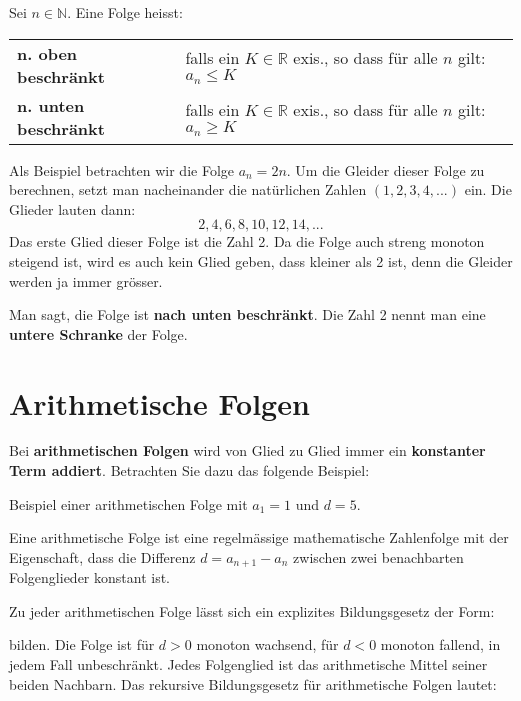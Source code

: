 \begin{definition} %
Sei $n \in \mathbb{N}$. Eine Folge heisst:

\begin{tabular}{ll}
\textbf{n. oben beschränkt} & falls ein $K \in \mathbb{R}$ exis., so dass für alle $n$ gilt: $a_{n} \leq K$ \\
\textbf{n. unten beschränkt} & falls ein $K \in \mathbb{R}$ exis., so dass für alle $n$ gilt: $a_{n} \geq K$ \\ %
\end{tabular}
\end{definition}

\begin{example}
Als Beispiel betrachten wir die Folge $a_{n} = 2n$. Um die Gleider dieser Folge zu berechnen, setzt man nacheinander die natürlichen Zahlen $(1,2,3,4,...)$ ein. Die Glieder lauten dann:
\[ 2,4,6,8,10,12,14,... \]
Das erste Glied dieser Folge ist  die Zahl 2. Da die Folge auch streng monoton steigend ist, wird es auch kein Glied geben, dass kleiner als 2 ist, denn die Gleider werden ja immer grösser.

Man sagt, die Folge ist \textbf{nach unten beschränkt}. Die Zahl 2 nennt man eine \textbf{untere Schranke} der Folge.
\end{example}

\section{Arithmetische Folgen}
Bei \textbf{arithmetischen Folgen} wird von Glied zu Glied immer ein \textbf{konstanter Term addiert}. Betrachten Sie dazu das folgende Beispiel:
\begin{example}
Beispiel einer arithmetischen Folge mit $a_{1} = 1$ und $d=5$. 
\begin{gelb}
\vspace{1.5cm}
\end{gelb}
\end{example}

\begin{definition}
Eine arithmetische Folge ist eine regelmässige mathematische Zahlenfolge mit der Eigenschaft, dass die Differenz $d = a_{n+1} - a_{n}$ zwischen zwei benachbarten Folgenglieder konstant ist.
\end{definition}

Zu jeder arithmetischen Folge lässt sich ein explizites Bildungsgesetz der Form:
\begin{gelb}
\vspace{2cm}
\end{gelb}
bilden. Die Folge ist für $d>0$ monoton wachsend, für $d<0$ monoton fallend, in jedem Fall unbeschränkt. Jedes Folgenglied ist das arithmetische Mittel seiner beiden Nachbarn. Das rekursive Bildungsgesetz für arithmetische Folgen lautet:
\begin{gelb}
\vspace{2cm}
\end{gelb}


